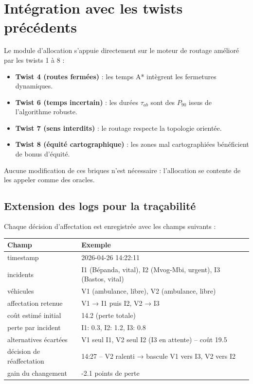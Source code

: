 \documentclass[12pt,a4paper]{article}
\theoremstyle{definition}
\theoremstyle{remark}
\begin{document}
\section{Intégration avec les twists précédents}

Le module d’allocation s’appuie directement sur le moteur de routage
amélioré par les twists 1 à 8 :

\begin{itemize}
  \item \textbf{Twist 4 (routes fermées)} : les temps A* intègrent les
        fermetures dynamiques.
  \item \textbf{Twist 6 (temps incertain)} : les durées $\tau_{ab}$ sont
        des $P_{90}$ issus de l’algorithme robuste.
  \item \textbf{Twist 7 (sens interdits)} : le routage respecte la
        topologie orientée.
  \item \textbf{Twist 8 (équité cartographique)} : les zones mal
        cartographiées bénéficient de bonus d’équité.
\end{itemize}

Aucune modification de ces briques n’est nécessaire : l’allocation se
contente de les appeler comme des oracles.

\subsection{Extension des logs pour la traçabilité}

Chaque décision d’affectation est enregistrée avec les champs suivants :

\begin{center}
\begin{tabular}{ll}
  \toprule
  \textbf{Champ} & \textbf{Exemple} \\
  \midrule
  timestamp & 2026-04-26 14:22:11 \\
  incidents & I1 (Bépanda, vital), I2 (Mvog-Mbi, urgent), I3 (Bastos, vital) \\
  véhicules & V1 (ambulance, libre), V2 (ambulance, libre) \\
  affectation retenue & V1 → I1 puis I2, V2 → I3 \\
  coût estimé initial & 14.2 (perte totale) \\
  perte par incident & I1: 0.3, I2: 1.2, I3: 0.8 \\
  alternatives écartées & V1 seul I1, V2 seul I2 (I3 en attente) – coût 19.5 \\
  décision de réaffectation & 14:27 – V2 ralenti → bascule V1 vers I3, V2 vers I2 \\
  gain du changement & -2.1 points de perte \\
  \bottomrule
\end{tabular}
\end{center}
\end{document}
